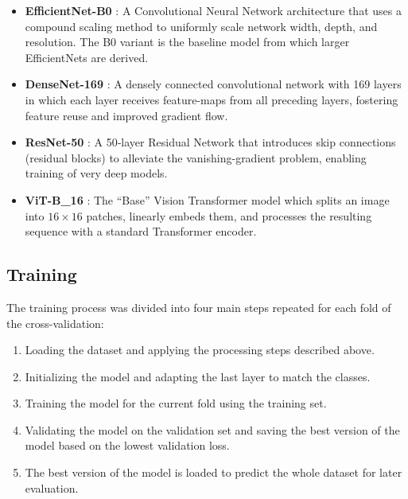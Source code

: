     \begin{itemize}
        \item \textbf{EfficientNet-B0} \autocite{tanEfficientNetRethinkingModel2019}:  
        A Convolutional Neural Network architecture that uses a compound scaling method to uniformly scale network width, depth, and resolution.  
        The B0 variant is the baseline model from which larger EfficientNets are derived.  

        \item \textbf{DenseNet-169} \autocite{huangDenselyConnectedConvolutional2017}:  
        A densely connected convolutional network with 169 layers in which each layer receives feature-maps from all preceding layers, fostering feature reuse and improved gradient flow.  

        \item \textbf{ResNet-50} \autocite{heDeepResidualLearning2016}:  
        A 50‐layer Residual Network that introduces skip connections (residual blocks) to alleviate the vanishing-gradient problem, enabling training of very deep models.  

        \item \textbf{ViT-B\_16} \autocite{dosovitskiyImageWorth16x162021}:  
        The “Base” Vision Transformer model which splits an image into \(16\times 16\) patches, linearly embeds them, and processes the resulting sequence with a standard Transformer encoder.  
    \end{itemize}

    \subsection{Training}

    The training process was divided into four main steps repeated for each fold of the cross-validation:
    \begin{enumerate}
        \item Loading the dataset and applying the processing steps described above.
        \item Initializing the model and adapting the last layer to match the classes.
        \item Training the model for the current fold using the training set.
        \item Validating the model on the validation set and saving the best version of the model based on the lowest validation loss.
        \item The best version of the model is loaded to predict the whole dataset for later evaluation.
    \end{enumerate}

